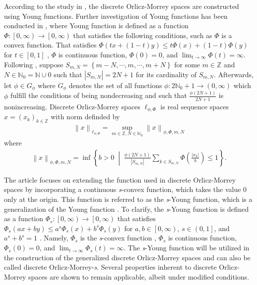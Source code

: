 \documentclass[12pt,a4paper]{article}
\theoremstyle{remark}
\begin{document}
According to the study in \cite{ref7}, the discrete Orlicz-Morrey spaces are constructed using Young functions. Further investigation of Young functions has been conducted in \cite{ref6}, where Young function is defined as a function $\Phi : \left[0, \infty\right) \rightarrow \left[0, \infty\right)$ that satisfies the following conditions, such as $\Phi$ is a convex function. That satisfies $\Phi\left(tx+\left(1-t\right)y\right) \leq t\Phi\left(x\right)+\left(1-t\right)\Phi\left(y\right)$ for $t\in\left[0,1\right]$ \cite{ref9}, $\Phi$ is continuous function, $\Phi\left(0\right) = 0$, and $\lim_{t\to \infty} \Phi \left(t\right)=\infty $.\\

Following \cite{ref7}, suppose $S_{m,N}=\left\{m-N,\cdots,m,\cdots,m+N\right\}$ for some $m\in\mathbb{Z}$ and $N\in\mathbb{N}_0=\mathbb{N}\cup 0$ such that $\left|S_{m,N}\right|=2N+1$ for its cardinality of $S_{m,N}$. Afterwards, let $\phi\in G_\phi$ where $G_\phi$ denotes the set of all functions $\phi : 2\mathbb{N}_0 +1 \rightarrow (0, \infty)$ which $\phi$ fulfill the conditions of being nondecreasing and such that $\frac{\phi\left(2N+1\right)}{2N+1}$ is nonincreasing. Discrete Orlicz-Morrey spaces $\ell_{\phi,\Phi}$ is real sequence spaces $x=\left(x_k\right)_{k\in\mathbb{Z}}$ with norm definded by 
\begin{eqnarray*}
    \left\lVert x\right\rVert _{\ell_{\phi,\Phi}} =\sup_{m\in\mathbb{Z}, N\in\mathbb{N}_0} \left\lVert x\right\rVert _{\phi,\Phi, m, N}
\end{eqnarray*}
where
\begin{eqnarray*}
    \left\lVert x\right\rVert _{\phi,\Phi, m, N} = \inf \left\{b>0 \;\middle|\; \frac{\phi\left(2N+1\right)}{\left|S_{m,N}\right|}\sum_{k\in S_{m,N}}\Phi\left(\frac{\left|x_k\right|}{b}\right) \leq 1\right\}.
\end{eqnarray*}

The article focuses on extending the function used in discrete Orlicz-Morrey spaces by incorporating a continuous \emph{s}-convex function, which takes the value 0 only at the origin. This function is referred to as the \emph{s}-Young function, which is a generalization of the Young function \cite{ref10}. To clarify, the \emph{s}-Young function is defined as a function $\Phi_s : \left[0, \infty\right) \rightarrow \left[0, \infty\right)$ that satisfies $\Phi_s \left(ax+by\right) \leq a^{s}\Phi_s\left(x\right)+b^{s}\Phi_s\left(y\right)$ for $a,b\in\left[0, \infty\right)$, $s\in\left(0,1\right]$, and $a^{s}+b^{s}=1$ . Namely, $\Phi_s$ is the \emph{s}-convex function \cite{ref8}, $\Phi_s$ is continuous function, $\Phi_s \left(0\right) = 0$, and $\lim_{t\to \infty} \Phi_s \left(t\right)=\infty$. The \emph{s}-Young function will be utilized in the construction of the generalized discrete Orlicz-Morrey spaces and can also be called discrete Orlicz-Morrey-\emph{s}. Several properties inherent to discrete Orlicz-Morrey spaces are shown to remain applicable, albeit under modified conditions.\\
\end{document}
